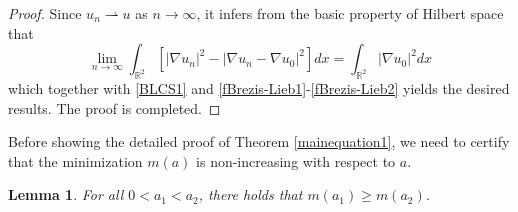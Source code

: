\documentclass[11pt]{amsart}
\numberwithin{equation}{section}
\newtheorem{lemma}[theorem]{Lemma}
\theoremstyle{definition}
\newcommand{\R}{\mathbb{R}}
\begin{document}
\begin{proof}
Since $u_n\rightharpoonup u$ as $n\to\infty$, it infers from the basic property of Hilbert space that
\[\lim_{n\to\infty} \int_{\R^2}[|\nabla u_n|^2 -|\nabla u_n-\nabla u_0|^2]dx = \int_{\R^2}|\nabla u_0 |^2dx\]
which together with \eqref{BLCS1} and \eqref{fBrezis-Lieb1}-\eqref{fBrezis-Lieb2}
yields the desired results. The proof is completed.
\end{proof}

Before showing the detailed proof of Theorem \ref{mainequation1},
we need to certify that the minimization $m(a)$ is non-increasing with respect to $a$.

\begin{lemma}\label{non-increasing}
For all $0<a_1<a_2$, there holds that $m(a_1)\geq m(a_2)$.
\end{lemma}
\end{document}
